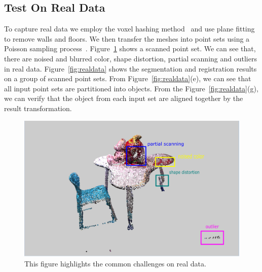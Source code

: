 \subsection{Test On Real Data}
To capture real data we employ the voxel hashing method~\cite{VXH} and use plane fitting to remove walls and floors. 
%
We then transfer the meshes into point sets using a Poisson sampling process~\cite{PossionSampling}.
%
Figure~\ref{fig:challenge} shows a scanned point set. We can see that, there are noised and blurred color, shape distortion, partial scanning and outliers in real data.
%
Figure~{\ref{fig:realdata}} shows the segmentation and registration results on a group of scanned point sets.
From Figure~\ref{fig:realdata}(e), we can see that all input point sets are partitioned into objects. From the Figure~\ref{fig:realdata}(g), we can verify that the object from each input set are aligned together by the result transformation.
\begin{figure}
	\centering
	\includegraphics[width=\linewidth]{images/challenge/challenge}
	\caption{\label{fig:challenge}This figure highlights the common challenges on real data.}
\end{figure}
